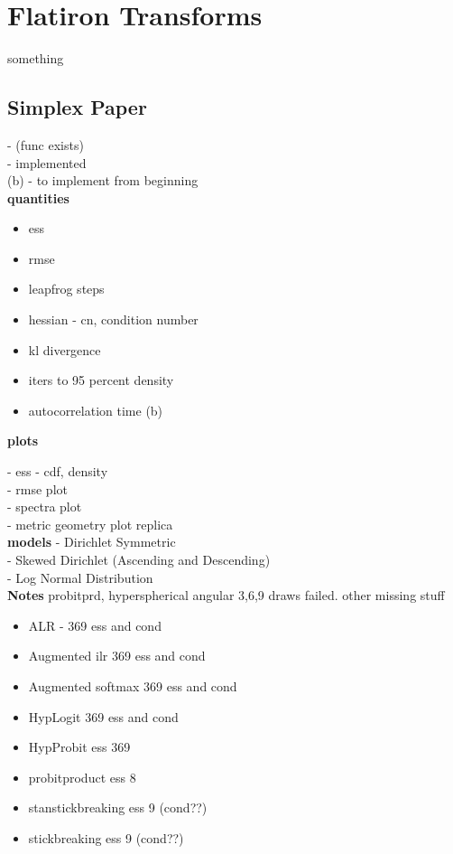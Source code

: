 \section{Flatiron Transforms}
\label{sec:transforms}
something
\subsection{Simplex Paper}

\* - (func exists)\\
\*\* - implemented\\
(b) - to implement from beginning\\

\textbf{quantities}
\begin{itemize}
\item ess \*\*\\
\item rmse \*\*\\
\item leapfrog steps \*\*\\
\item hessian - cn, condition number \*\\
\item kl divergence \*\*\\
\item iters to 95 percent density \*\\
\item autocorrelation time (b)\\
\end{itemize}

\textbf{plots}

- ess - cdf, density\\
- rmse plot\\
- spectra plot\\
- metric geometry plot replica\\

\textbf{models}
- Dirichlet Symmetric\\
- Skewed Dirichlet (Ascending and Descending)\\
- Log Normal Distribution\\


\textbf{Notes}
probitprd, hyperspherical angular 3,6,9 draws failed. other missing stuff
\begin{itemize}

\item ALR - 369 ess and cond
\item Augmented ilr 369 ess and cond
\item Augmented softmax 369 ess and cond
\item HypLogit 369 ess and cond
\item HypProbit ess 369

\item probitproduct ess 8
\item stanstickbreaking ess 9 (cond??)
\item stickbreaking ess 9 (cond??)
\end{itemize}


